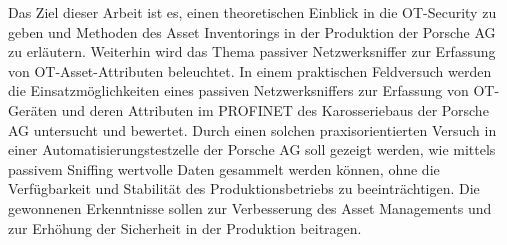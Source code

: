 Das Ziel dieser Arbeit ist es, einen theoretischen Einblick in die OT-Security zu geben und Methoden des Asset Inventorings in der Produktion der Porsche AG zu erläutern. Weiterhin wird das Thema passiver Netzwerksniffer zur Erfassung von OT-Asset-Attributen beleuchtet. In einem praktischen Feldversuch werden die Einsatzmöglichkeiten eines passiven Netzwerksniffers zur Erfassung von OT-Geräten und deren Attributen im PROFINET des Karosseriebaus der Porsche AG untersucht und bewertet. Durch einen solchen praxisorientierten Versuch in einer Automatisierungstestzelle der Porsche AG soll gezeigt werden, wie mittels passivem Sniffing wertvolle Daten gesammelt werden können, ohne die Verfügbarkeit und Stabilität des Produktionsbetriebs zu beeinträchtigen. Die gewonnenen Erkenntnisse sollen zur Verbesserung des Asset Managements und zur Erhöhung der Sicherheit in der Produktion beitragen.

